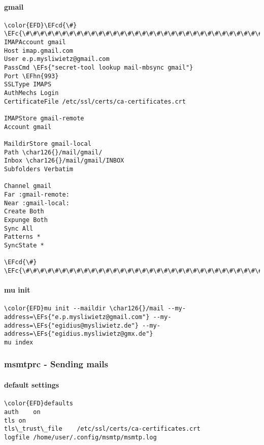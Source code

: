 \documentclass[a4wide,10pt]{article}
\newcommand{\EFc}[1]{\textcolor{EFc}{#1}} %
\newcommand{\EFcd}[1]{\textcolor{EFcd}{#1}} %
\newcommand{\EFs}[1]{\textcolor{EFs}{#1}} %
\newcommand{\EFhn}[1]{\textcolor{EFhn}{\textbf{#1}}} %
\begin{document}
\paragraph{gmail}
\label{sec:org958317d}
\begin{Code}
\begin{Verbatim}
\color{EFD}\EFcd{\#} \EFc{\#\#\#\#\#\#\#\#\#\#\#\#\#\#\#\#\#\#\#\#\#\#\#\#\#\#\#\#\#\#\#\#\#\#\#\#\#\#\#\#\#\#\#\#}
IMAPAccount gmail
Host imap.gmail.com
User e.p.mysliwietz@gmail.com
PassCmd \EFs{"secret-tool lookup mail-mbsync gmail"}
Port \EFhn{993}
SSLType IMAPS
AuthMechs Login
CertificateFile /etc/ssl/certs/ca-certificates.crt

IMAPStore gmail-remote
Account gmail

MaildirStore gmail-local
Path \char126{}/mail/gmail/
Inbox \char126{}/mail/gmail/INBOX
Subfolders Verbatim

Channel gmail
Far :gmail-remote:
Near :gmail-local:
Create Both
Expunge Both
Sync All
Patterns *
SyncState *

\EFcd{\#} \EFc{\#\#\#\#\#\#\#\#\#\#\#\#\#\#\#\#\#\#\#\#\#\#\#\#\#\#\#\#\#\#\#\#\#\#\#\#\#\#\#\#\#\#\#}
\end{Verbatim}
\end{Code}
\paragraph{mu init}
\label{sec:orgd076f48}
\begin{Code}
\begin{Verbatim}
\color{EFD}mu init --maildir \char126{}/mail --my-address=\EFs{"e.p.mysliwietz@gmail.com"} --my-address=\EFs{"egidius@mysliwietz.de"} --my-address=\EFs{"egidius.mysliwietz@gmx.de"}
mu index
\end{Verbatim}
\end{Code}
\subsubsection{msmtprc - Sending mails}
\label{sec:orgfe6f0b1}
\paragraph{default settings}
\label{sec:orgace7177}
\begin{Code}
\begin{Verbatim}
\color{EFD}defaults
auth	on
tls	on
tls\_trust\_file	/etc/ssl/certs/ca-certificates.crt
logfile /home/user/.config/msmtp/msmtp.log

\end{Verbatim}
\end{Code}
\end{document}
